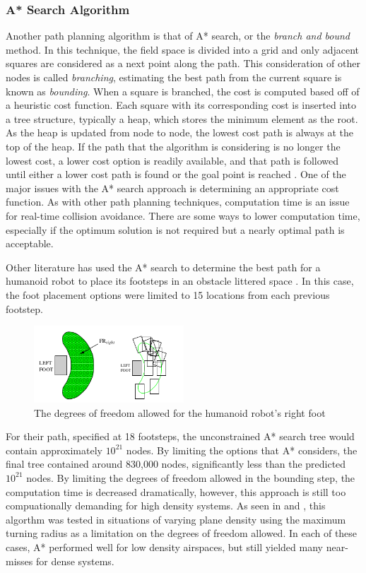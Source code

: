 \documentclass[10pt, conference, compsocconf]{IEEEtran}
\begin{document}
\subsubsection{A* Search Algorithm}
Another path planning algorithm is that of A* search, or the {\it branch and bound} method.  In this technique, the field space is divided into a grid and only adjacent squares are considered as a next point along the path.  This consideration of other nodes is called {\it branching}, estimating the best path from the current square is known as {\it bounding}.  When a square is branched, the cost is computed based off of a heuristic cost function. Each square with its corresponding cost is inserted into a tree structure, typically a heap, which stores the minimum element as the root. As the heap is updated from node to node, the lowest cost path is always at the top of the heap.  If the path that the algorithm is considering is no longer the lowest cost, a lower cost option is readily available, and that path is followed until either a lower cost path is found or the goal point is reached \cite{lastyearDSAS}.  One of the major issues with the A* search approach is determining an appropriate cost function.  As with other path planning techniques, computation time is an issue for real-time collision avoidance. There are some ways to lower computation time, especially if the optimum solution is not required but a nearly optimal path is acceptable. 

Other literature has used the A* search to determine the best path for a humanoid robot to place its footsteps in an obstacle littered space \cite{kuffner2005motion}.  In this case, the foot placement options were limited to 15 locations from each previous footstep.

\begin{figure}[position here]
  \centering
    \includegraphics[width=0.5\textwidth]{EPS/AStarRobot}
  \caption{The degrees of freedom allowed for the humanoid robot's right foot \cite{kuffner2005motion}}
\end{figure}

For their path, specified at 18 footsteps, the unconstrained A* search tree would contain approximately $10^{21}$ nodes. By limiting the options that A* considers, the final tree contained around 830,000 nodes, significantly less than the predicted $10^{21}$ nodes. By limiting the degrees of freedom allowed in the bounding step, the computation time is decreased dramatically, however, this approach is still too compuationally demanding for high density systems. As seen in \cite{liao2012uav} and \cite{lastyearDSAS}, this algorthm was tested in situations of varying plane density using the maximum turning radius as a limitation on the degrees of freedom allowed.  In each of these cases, A* performed well for low density airspaces, but still yielded many near-misses for dense systems.  
\end{document}
